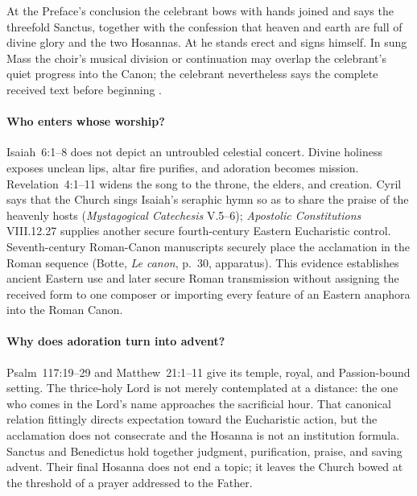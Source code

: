 
At the Preface's conclusion the celebrant bows with hands joined and says the threefold Sanctus, together with the confession that heaven and earth are full of divine glory and the two Hosannas. At  he stands erect and signs himself. In sung Mass the choir's musical division or continuation may overlap the celebrant's quiet progress into the Canon; the celebrant nevertheless says the complete received text before beginning .

\paragraph{Who enters whose worship?}
Isaiah~6:1--8 does not depict an untroubled celestial concert. Divine holiness exposes unclean lips, altar fire purifies, and adoration becomes mission. Revelation~4:1--11 widens the song to the throne, the elders, and creation. Cyril says that the Church sings Isaiah's seraphic hymn so as to share the praise of the heavenly hosts (\emph{Mystagogical Catechesis} V.5--6); \emph{Apostolic Constitutions} VIII.12.27 supplies another secure fourth-century Eastern Eucharistic control. Seventh-century Roman-Canon manuscripts securely place the acclamation in the Roman sequence (Botte, \emph{Le canon}, p.~30, apparatus). This evidence establishes ancient Eastern use and later secure Roman transmission without assigning the received form to one composer or importing every feature of an Eastern anaphora into the Roman Canon.

\paragraph{Why does adoration turn into advent?}
Psalm~117:19--29 and Matthew~21:1--11 give  its temple, royal, and Passion-bound setting. The thrice-holy Lord is not merely contemplated at a distance: the one who comes in the Lord's name approaches the sacrificial hour. That canonical relation fittingly directs expectation toward the Eucharistic action, but the acclamation does not consecrate and the Hosanna is not an institution formula. Sanctus and Benedictus hold together judgment, purification, praise, and saving advent. Their final Hosanna does not end a topic; it leaves the Church bowed at the threshold of a prayer addressed to the Father.


